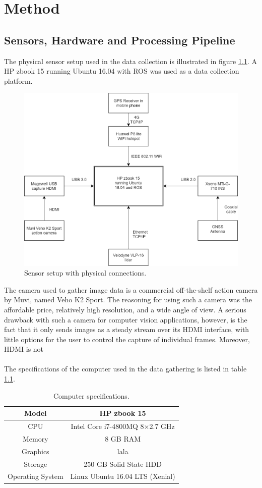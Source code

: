 
\chapter{Method}
\section{Sensors, Hardware and Processing Pipeline}
The physical sensor setup used in the data collection is illustrated in figure \ref{fig:sensor_setup}. A HP zbook 15 running Ubuntu 16.04 with ROS was used as a data collection platform.
\begin{figure}[H]
    \centering
    \includegraphics[width=.8\linewidth]{fig/sensor_setup.png}
    \caption{Sensor setup with physical connections.}
    \label{fig:sensor_setup}
\end{figure}
The camera used to gather image data is a commercial off-the-shelf action camera by Muvi, named Veho K2 Sport. The reasoning for using such a camera was the affordable price, relatively high resolution, and a wide angle of view. A serious drawback with such a camera for computer vision applications, however, is the fact that it only sends images as a steady stream over its HDMI interface, with little options for the user to control the capture of individual frames. Moreover, HDMI is not  \\
\vspace{2mm}\\
\noindent The specifications of the computer used in the data gathering is listed in table \ref{tab:comp_specs_laptop}.
\begin{table}[H]
	\centering
	\begin{tabular}[H]{|c|c|}\hline
	Model & HP zbook 15\\\hline
	CPU & Intel Core i7-4800MQ 8$\times$2.7 GHz \\\hline
	Memory & 8 GB RAM \\\hline
	Graphics & lala \\\hline
	Storage & 250 GB Solid State HDD \\\hline
	Operating System & Linux Ubuntu 16.04 LTS (Xenial)\\
	\hline
	\end{tabular}
	\caption{Computer specifications.}
	\label{tab:comp_specs_laptop}
\end{table}
